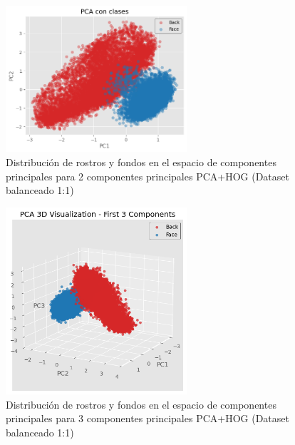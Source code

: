 \documentclass{article}
\begin{document}
\begin{figure}[H]
    \centering
    \includegraphics[width=0.6\textwidth]{tarea_4/imagenes/pca_classes_x1_v1_20_2_components.png}
    \caption{Distribución de rostros y fondos en el espacio de componentes principales para 2 componentes principales PCA+HOG (Dataset balanceado 1:1)}
    \label{fig:pca_classes}
\end{figure}

\begin{figure}[H]
    \centering
    \includegraphics[width=0.6\textwidth]{tarea_4/imagenes/pca_classes_x1_v1_20_3_components.png}
    \caption{Distribución de rostros y fondos en el espacio de componentes principales para 3 componentes principales PCA+HOG (Dataset balanceado 1:1)}
    \label{fig:pca_classes}
\end{figure}
\end{document}
